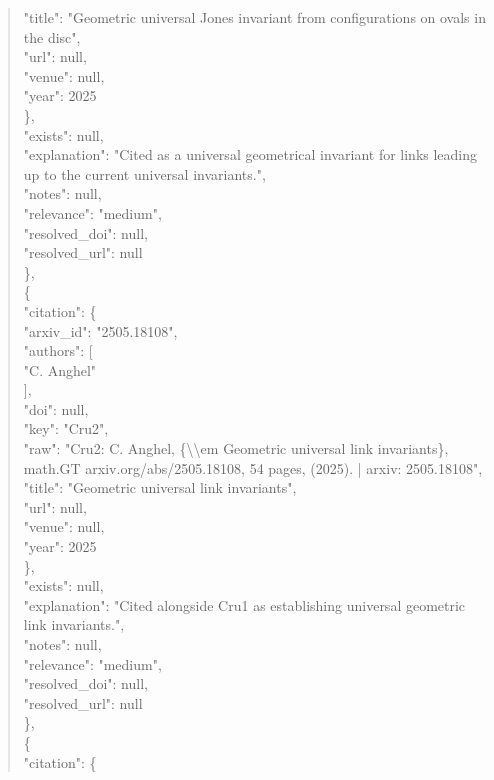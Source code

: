 \documentclass[11pt]{article}
\begin{document}
\begin{quote}
        "title": "Geometric universal Jones invariant from configurations on ovals in the disc",\\
        "url": null,\\
        "venue": null,\\
        "year": 2025\\
      \},\\
      "exists": null,\\
      "explanation": "Cited as a universal geometrical invariant for links leading up to the current universal invariants.",\\
      "notes": null,\\
      "relevance": "medium",\\
      "resolved\_doi": null,\\
      "resolved\_url": null\\
    \},\\
    \{\\
      "citation": \{\\
        "arxiv\_id": "2505.18108",\\
        "authors": [\\
          "C. Anghel"\\
        ],\\
        "doi": null,\\
        "key": "Cru2",\\
        "raw": "Cru2: C. Anghel, \{\textbackslash{}\textbackslash{}em Geometric universal link invariants\}, math.GT arxiv.org/abs/2505.18108, 54 pages, (2025). | arxiv: 2505.18108",\\
        "title": "Geometric universal link invariants",\\
        "url": null,\\
        "venue": null,\\
        "year": 2025\\
      \},\\
      "exists": null,\\
      "explanation": "Cited alongside Cru1 as establishing universal geometric link invariants.",\\
      "notes": null,\\
      "relevance": "medium",\\
      "resolved\_doi": null,\\
      "resolved\_url": null\\
    \},\\
    \{\\
      "citation": \{\\

\end{quote}
\end{document}
